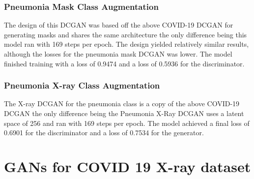 \subsubsection{Pneumonia Mask Class Augmentation}
The design of this DCGAN was based off the above COVID-19 DCGAN for generating masks and shares the same architecture the only difference being this model ran with 169 steps per epoch. The design yielded relatively similar results, although the losses for the pneumonia mask DCGAN was lower.  The model finished training with a loss of 0.9474 and a loss of 0.5936 for the discriminator.
\subsubsection{Pneumonia X-ray Class Augmentation}
The X-ray DCGAN for the pneumonia class is a copy of the above COVID-19 DCGAN the only difference being the Pneumonia X-Ray DCGAN uses a latent space of 256 and ran with 169 steps per epoch.  The model achieved a final loss of 0.6901 for the discriminator and a loss of 0.7534 for the generator.
\section{GANs for COVID 19 X-ray dataset}
